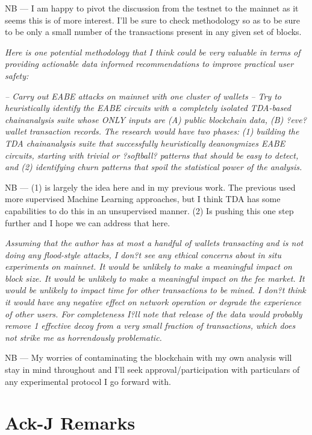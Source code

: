 \documentclass[prc, 12pt]{revtex4-1}
\begin{document}
NB --- I am happy to pivot the discussion from the testnet to the mainnet as it seems this is of more interest.  I'll be sure to check methodology so as to be sure to be only a small number of the transactions present in any given set of blocks.

\textit{Here is one potential methodology that I think could be very valuable in terms of providing actionable data informed recommendations to improve practical user safety:}

\textit{-- Carry out EABE attacks on mainnet with one cluster of wallets}
\textit{-- Try to heuristically identify the EABE circuits with a completely isolated TDA-based chainanalysis suite whose ONLY inputs are (A) public blockchain data, (B) ?eve? wallet transaction records.}
\textit{The research would have two phases:}
\textit{(1) building the TDA chainanalysis suite that successfully heuristically deanonymizes EABE circuits, starting with trivial or ?softball? patterns that should be easy to detect, and
(2) identifying churn patterns that spoil the statistical power of the analysis.}

NB --- (1) is largely the idea here and in my previous work.  The previous used more supervised Machine Learning approaches, but I think TDA has some capabilities to do this in an unsupervised manner.  (2) Is pushing this one step further and I hope we can address that here.

\textit{Assuming that the author has at most a handful of wallets transacting and is not doing any flood-style attacks, I don?t see any ethical concerns about in situ experiments on mainnet. It would be unlikely to make a meaningful impact on block size. It would be unlikely to make a meaningful impact on the fee market. It would be unlikely to impact time for other transactions to be mined. I don?t think it would have any negative effect on network operation or degrade the experience of other users. For completeness I?ll note that release of the data would probably remove 1 effective decoy from a very small fraction of transactions, which does not strike me as horrendously problematic.}

NB --- My worries of contaminating the blockchain with my own analysis will stay in mind throughout and I'll seek approval/participation with particulars of any experimental protocol I go forward with.  

\section{Ack-J Remarks}
\end{document}
